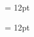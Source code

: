 \documentclass[a4paper,twoside]{article}
\begin{document}
\begin{multicols}{2}
\begin{spacing}{0.5}{\raggedright}
\begin{spacing}{0.5}{\raggedright} 
\spanheadwordminorentryvariantheadwordminorentryvariantletDatadicBody{ }\spanspanminorentryvariantletDatadicBody{ \{} \spanheadwordreferencedentryreferencedentriesvisiblevariantentryrefsminorentryvariantspanmxbheadwordspanspanspanspanminorentryvariantletDatadicBody{ } \spanspanminorentryvariantletDatadicBody{\} }\spanspanesspanminorentryvariantletDatadicBody{ }  \end{spacing}
\begin{spacing}{0.5}
\hangindent= 12pt
  \spanpartofspeechmorphosyntaxanalysissensesensecontentsensesentryspanespartofspeechspansensespanspanentryletDatadicBody{ } \spandefinitionsensesensecontentsensesentryspanesspansensespanspanentryletDatadicBody{ } \end{spacing}
\begin{spacing}{0.5}
\hangindent= 12pt

\end{spacing}
\end{spacing}
\end{multicols}
\end{document}
